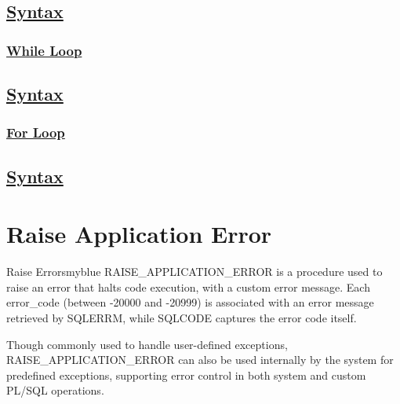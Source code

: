 \subsection*{\underline{Syntax}}






\subsubsection{\underline{While Loop}}

\subsection*{\underline{Syntax}}





\vspace{0.25cm}



\subsubsection{\underline{For Loop}}

\subsection*{\underline{Syntax}}




\vspace{0.5cm}

\section{Raise Application Error}
\begin{prettyBox}{Raise Errors}{myblue}
RAISE\_APPLICATION\_ERROR is a procedure used to raise an error that halts code execution, with a custom error
message. Each error\_code (between -20000 and -20999) is associated with an error message retrieved 
by SQLERRM, while SQLCODE captures the error code itself.

\vspace{0.25cm}




\vspace{0.25cm}


Though commonly used to handle user-defined exceptions, RAISE\_APPLICATION\_ERROR can also be used internally
by the system for predefined exceptions, supporting error control in both system and custom PL/SQL operations.
\end{prettyBox}

